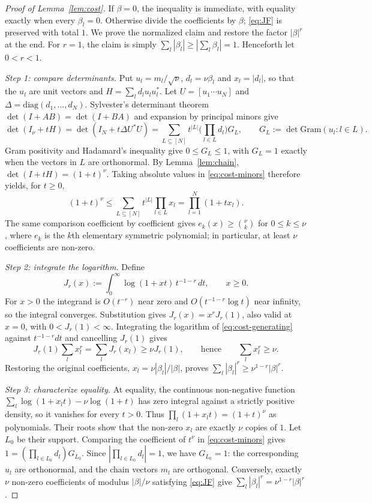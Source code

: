 \begin{proof}[Proof of Lemma~\ref{lem:cost}]
If $\beta=0$, the inequality is immediate, with equality exactly when every $\beta_l=0$. Otherwise divide the coefficients by $\beta$; \eqref{eq:JF} is preserved with total $1$. We prove the normalized claim and restore the factor $|\beta|^r$ at the end. For $r=1$, the claim is simply $\sum_l|\beta_l|\ge|\sum_l\beta_l|=1$. Henceforth let $0<r<1$.

\emph{Step 1: compare determinants.} Put $u_l=m_l/\sqrt\nu$, $d_l=\nu\beta_l$ and $x_l=|d_l|$, so that the $u_l$ are unit vectors and $H=\sum_ld_lu_lu_l^*$. Let $U=[u_1\cdots u_N]$ and $\Delta=\mathrm{diag}(d_1,\dots,d_N)$. Sylvester's determinant theorem $\det(I+AB)=\det(I+BA)$ \citep[Ch.~1]{horn2012matrix} and expansion by principal minors give
\begin{equation}
\det(I_\nu+tH)=\det(I_N+t\Delta U^*U)
=\sum_{L\subseteq[N]}t^{|L|}\Big(\prod_{l\in L}d_l\Big)G_L,
\qquad G_L:=\det\mathrm{Gram}(u_l:l\in L).
\label{eq:cost-minors}
\end{equation}
Gram positivity and Hadamard's inequality \citep[Ch.~7]{horn2012matrix} give $0\le G_L\le1$, with $G_L=1$ exactly when the vectors in $L$ are orthonormal. By Lemma~\ref{lem:chain}, $\det(I+tH)=(1+t)^\nu$. Taking absolute values in \eqref{eq:cost-minors} therefore yields, for $t\ge0$,
\begin{equation}
(1+t)^\nu\le\sum_{L\subseteq[N]}t^{|L|}\prod_{l\in L}x_l
=\prod_{l=1}^N(1+tx_l).
\label{eq:cost-generating}
\end{equation}
The same comparison coefficient by coefficient gives $e_k(x)\ge\binom\nu k$ for $0\le k\le\nu$, where $e_k$ is the $k$th elementary symmetric polynomial; in particular, at least $\nu$ coefficients are non-zero.

\emph{Step 2: integrate the logarithm.} Define
\[
J_r(x):=\int_0^\infty\log(1+xt)\,t^{-1-r}\,dt,\qquad x\ge0.
\]
For $x>0$ the integrand is $O(t^{-r})$ near zero and $O(t^{-1-r}\log t)$ near infinity, so the integral converges. Substitution gives $J_r(x)=x^rJ_r(1)$, also valid at $x=0$, with $0<J_r(1)<\infty$. Integrating the logarithm of \eqref{eq:cost-generating} against $t^{-1-r}dt$ and cancelling $J_r(1)$ gives
\[
J_r(1)\sum_lx_l^r=\sum_lJ_r(x_l)\ge\nu J_r(1),
\qquad\text{hence}\qquad \sum_lx_l^r\ge\nu.
\]
Restoring the original coefficients, $x_l=\nu|\beta_l|/|\beta|$, proves $\sum_l|\beta_l|^r\ge\nu^{1-r}|\beta|^r$.

\emph{Step 3: characterize equality.} At equality, the continuous non-negative function $\sum_l\log(1+x_lt)-\nu\log(1+t)$ has zero integral against a strictly positive density, so it vanishes for every $t>0$. Thus $\prod_l(1+x_lt)=(1+t)^\nu$ as polynomials. Their roots show that the non-zero $x_l$ are exactly $\nu$ copies of $1$. Let $L_0$ be their support. Comparing the coefficient of $t^\nu$ in \eqref{eq:cost-minors} gives $1=(\prod_{l\in L_0}d_l)G_{L_0}$. Since $|\prod_{l\in L_0}d_l|=1$, we have $G_{L_0}=1$: the corresponding $u_l$ are orthonormal, and the chain vectors $m_l$ are orthogonal. Conversely, exactly $\nu$ non-zero coefficients of modulus $|\beta|/\nu$ satisfying \eqref{eq:JF} give $\sum_l|\beta_l|^r=\nu^{1-r}|\beta|^r$.
\end{proof}

